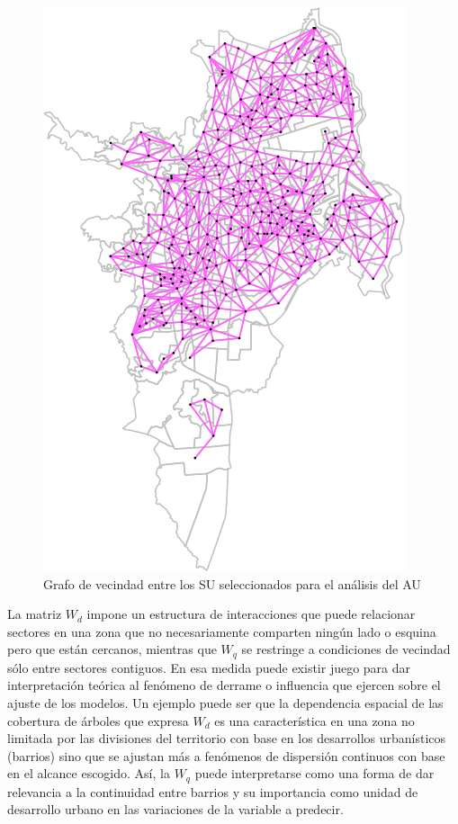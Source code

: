 \documentclass[12pt,]{book}
\begin{document}
\begin{figure}
\includegraphics[width=1\linewidth]{tesis-unigis_files/figure-latex/w-su-reg-1} \caption{Grafo de vecindad entre los SU seleccionados para el análisis del AU}\label{fig:w-su-reg}
\end{figure}

La matriz \(W_d\) impone un estructura de interacciones que puede
relacionar sectores en una zona que no necesariamente comparten ningún
lado o esquina pero que están cercanos, mientras que \(W_q\) se
restringe a condiciones de vecindad sólo entre sectores contiguos. En
esa medida puede existir juego para dar interpretación teórica al
fenómeno de derrame o influencia que ejercen sobre el ajuste de los
modelos. Un ejemplo puede ser que la dependencia espacial de las
cobertura de árboles que expresa \(W_d\) es una característica en una
zona no limitada por las divisiones del territorio con base en los
desarrollos urbanísticos (barrios) sino que se ajustan más a fenómenos
de dispersión continuos con base en el alcance escogido. Así, la \(W_q\)
puede interpretarse como una forma de dar relevancia a la continuidad
entre barrios y su importancia como unidad de desarrollo urbano en las
variaciones de la variable a predecir.
\end{document}
